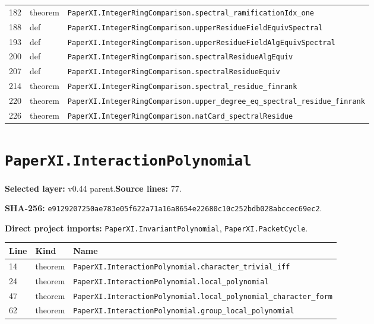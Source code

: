 \documentclass[10pt,oneside]{book}
\begin{document}
\begin{longtable}{@{}p{}p{}p{}@{}}
182&theorem&\nolinkurl{PaperXI.IntegerRingComparison.spectral_ramificationIdx_one}\\

188&def&\nolinkurl{PaperXI.IntegerRingComparison.upperResidueFieldEquivSpectral}\\

193&def&\nolinkurl{PaperXI.IntegerRingComparison.upperResidueFieldAlgEquivSpectral}\\

200&def&\nolinkurl{PaperXI.IntegerRingComparison.spectralResidueAlgEquiv}\\

207&def&\nolinkurl{PaperXI.IntegerRingComparison.spectralResidueEquiv}\\

214&theorem&\nolinkurl{PaperXI.IntegerRingComparison.spectral_residue_finrank}\\

220&theorem&\nolinkurl{PaperXI.IntegerRingComparison.upper_degree_eq_spectral_residue_finrank}\\

226&theorem&\nolinkurl{PaperXI.IntegerRingComparison.natCard_spectralResidue}\\

\bottomrule\end{longtable}

\section{\texorpdfstring{\nolinkurl{PaperXI.InteractionPolynomial}}{PaperXI.InteractionPolynomial}}\label{module:PaperXI.InteractionPolynomial}

\textbf{Selected layer:} v0.44 parent.\quad\textbf{Source lines:} 77.\par\textbf{SHA-256:} {\scriptsize\nolinkurl{e9129207250ae783e05f622a71a16a8654e22680c10c252bdb028abccec69ec2}}.


\textbf{Direct project imports:} \nolinkurl{PaperXI.InvariantPolynomial}, \nolinkurl{PaperXI.PacketCycle}.

\begin{longtable}{@{}p{}p{}p{}@{}}\toprule Line&Kind&Name\\\midrule\endhead

14&theorem&\nolinkurl{PaperXI.InteractionPolynomial.character_trivial_iff}\\

24&theorem&\nolinkurl{PaperXI.InteractionPolynomial.local_polynomial}\\

47&theorem&\nolinkurl{PaperXI.InteractionPolynomial.local_polynomial_character_form}\\

62&theorem&\nolinkurl{PaperXI.InteractionPolynomial.group_local_polynomial}\\

\bottomrule\end{longtable}
\end{document}
